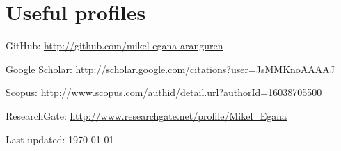 \documentclass[11pt,fullpage]{article}
\renewenvironment{itemize}{
  \begin{list}{}{
    \setlength{\leftmargin}{1.5em} 
  }  
}{
  \end{list}
}
\begin{document}
\section*{Useful profiles}
\begin{itemize}
	\item GitHub: \href{http://github.com/mikel-egana-aranguren}{http://github.com/mikel-egana-aranguren}
	\item Google Scholar: \href{hhttp://scholar.google.com/citations?user=JsMMKnoAAAAJ}{http://scholar.google.com/citations?user=JsMMKnoAAAAJ}
	\item Scopus: \href{http://www.scopus.com/authid/detail.url?authorId=16038705500}{http://www.scopus.com/authid/detail.url?authorId=16038705500}
	\item ResearchGate: \href{http://www.researchgate.net/profile/Mikel_Egana}{http://www.researchgate.net/profile/Mikel\_Egana}
\end{itemize}

 




\bigskip
\begin{center}
  \begin{footnotesize}
    Last updated: \today
  \end{footnotesize}
\end{center}



\end{document}
